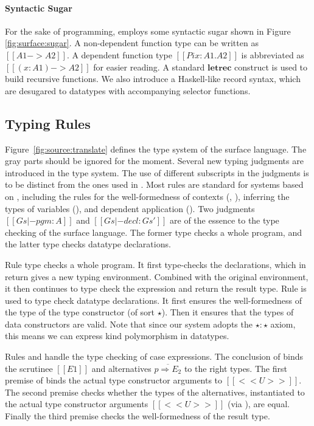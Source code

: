\paragraph{Syntactic Sugar}
For the sake of programming, \sufcc employs some syntactic sugar shown
in Figure \ref{fig:surface:sugar}. A non-dependent function type can
be written as $[[A1 -> A2]]$. A dependent function type
$[[Pi x : A1 . A2]]$ is abbreviated as $[[(x : A1) -> A2]]$ for easier
reading. A standard $\mathbf{letrec}$ construct is used to build
recursive functions. We also introduce a Haskell-like record syntax,
which are desugared to datatypes with accompanying selector functions.


\subsection{Typing Rules}
Figure~\ref{fig:source:translate} defines the type system of the
surface language. The gray parts should be ignored for the moment. Several new
typing judgments are introduced in the type system. The use of
different subscripts in the judgments is to be distinct from the ones
used in \name. Most rules are standard for systems based on \coc,
including the rules for the well-formedness of contexts
(, ), inferring the types of
variables (), and dependent application
(). Two judgments $[[Gs |- pgm : A]]$ and
$[[Gs |- decl : Gs']]$ are of the essence to the type checking of the
surface language. The former type checks a whole program, and the
latter type checks datatype declarations.

Rule  type checks a whole program. It first
type-checks the declarations, which in return gives a new typing
environment. Combined with the original environment, it then continues
to type check the expression and return the result type. Rule
 is used to type check datatype declarations. It
first ensures the well-formedness of the type of the type constructor
(of sort $\star$). Then it ensures that the types of data constructors
are valid.  Note that since our system adopts the $\star : \star$
axiom, this means we can express kind polymorphism in datatypes.

Rules  and  handle the type
checking of case expressions. The conclusion of 
binds the scrutinee $[[E1]]$ and alternatives
$\overline{p \Rightarrow E_2}$ to the right types. The first premise
of  binds the actual type constructor arguments to
$[[<<U>>]]$. The second premise checks whether the types of the
alternatives, instantiated to the actual type constructor arguments
$[[<<U>>]]$ (via ), are equal. Finally the third
premise checks the well-formedness of the result type.

